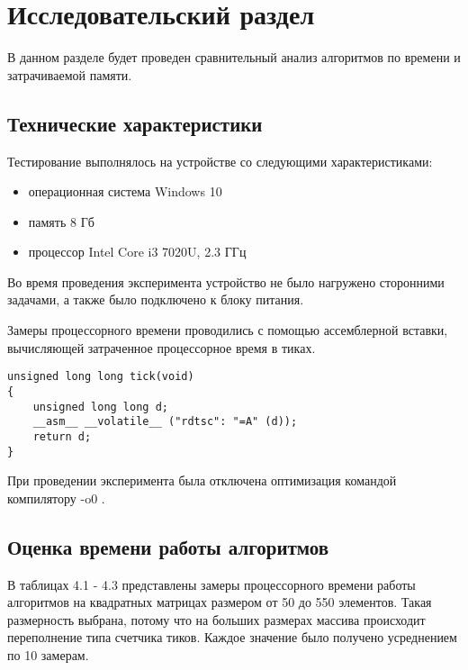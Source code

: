 \chapter{Исследовательский раздел}

В данном разделе будет проведен сравнительный анализ алгоритмов по
времени и затрачиваемой памяти.

\section{Технические характеристики}

Тестирование выполнялось на устройстве со следующими характеристиками: 
\begin{itemize}
	\item операционная система Windows 10 \cite{windows10}
	\item память 8 Гб
	\item процессор Intel Core i3 7020U, 2.3 ГГц \cite{intel}
\end{itemize}

Во время проведения эксперимента устройство не было нагружено сторонними задачами, а также было подключено к блоку питания.

Замеры процессорного времени проводились с помощью ассемблерной вставки, вычисляющей затраченное процессорное время в тиках.

\captionsetup{singlelinecheck = false, justification=raggedright}
\begin{lstlisting}[label=tick, caption=Ассемблерная вставка замера процессорного времени в тиках]
unsigned long long tick(void)
{
    unsigned long long d;
    __asm__ __volatile__ ("rdtsc": "=A" (d));
    return d;
}
\end{lstlisting}
\captionsetup{singlelinecheck = false, justification=centering}

При проведении эксперимента была отключена оптимизация командой компилятору -o0 \cite{std=c99}.

\section{Оценка времени работы алгоритмов}

В таблицах 4.1 - 4.3 представлены замеры процессорного времени работы алгоритмов на квадратных матрицах размером от 50 до 550 элементов. Такая размерность выбрана, потому что на больших размерах массива происходит переполнение типа счетчика тиков. Каждое значение было получено усреднением по 10 замерам. 

